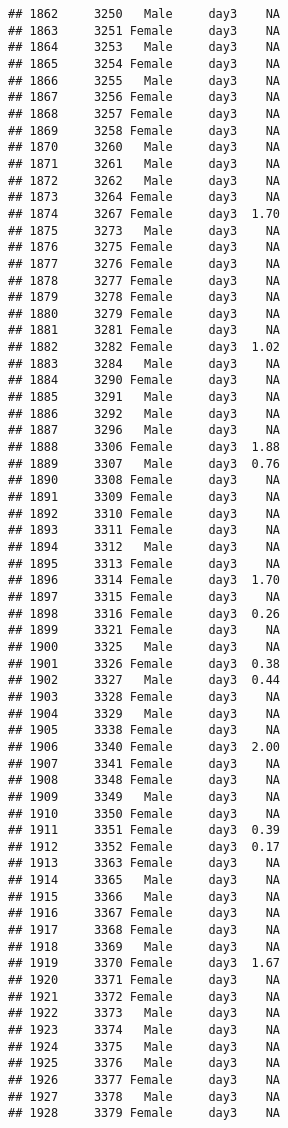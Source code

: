 \documentclass[
]{article}
\begin{document}
\begin{verbatim}
## 1862     3250   Male     day3    NA
## 1863     3251 Female     day3    NA
## 1864     3253   Male     day3    NA
## 1865     3254 Female     day3    NA
## 1866     3255   Male     day3    NA
## 1867     3256 Female     day3    NA
## 1868     3257 Female     day3    NA
## 1869     3258 Female     day3    NA
## 1870     3260   Male     day3    NA
## 1871     3261   Male     day3    NA
## 1872     3262   Male     day3    NA
## 1873     3264 Female     day3    NA
## 1874     3267 Female     day3  1.70
## 1875     3273   Male     day3    NA
## 1876     3275 Female     day3    NA
## 1877     3276 Female     day3    NA
## 1878     3277 Female     day3    NA
## 1879     3278 Female     day3    NA
## 1880     3279 Female     day3    NA
## 1881     3281 Female     day3    NA
## 1882     3282 Female     day3  1.02
## 1883     3284   Male     day3    NA
## 1884     3290 Female     day3    NA
## 1885     3291   Male     day3    NA
## 1886     3292   Male     day3    NA
## 1887     3296   Male     day3    NA
## 1888     3306 Female     day3  1.88
## 1889     3307   Male     day3  0.76
## 1890     3308 Female     day3    NA
## 1891     3309 Female     day3    NA
## 1892     3310 Female     day3    NA
## 1893     3311 Female     day3    NA
## 1894     3312   Male     day3    NA
## 1895     3313 Female     day3    NA
## 1896     3314 Female     day3  1.70
## 1897     3315 Female     day3    NA
## 1898     3316 Female     day3  0.26
## 1899     3321 Female     day3    NA
## 1900     3325   Male     day3    NA
## 1901     3326 Female     day3  0.38
## 1902     3327   Male     day3  0.44
## 1903     3328 Female     day3    NA
## 1904     3329   Male     day3    NA
## 1905     3338 Female     day3    NA
## 1906     3340 Female     day3  2.00
## 1907     3341 Female     day3    NA
## 1908     3348 Female     day3    NA
## 1909     3349   Male     day3    NA
## 1910     3350 Female     day3    NA
## 1911     3351 Female     day3  0.39
## 1912     3352 Female     day3  0.17
## 1913     3363 Female     day3    NA
## 1914     3365   Male     day3    NA
## 1915     3366   Male     day3    NA
## 1916     3367 Female     day3    NA
## 1917     3368 Female     day3    NA
## 1918     3369   Male     day3    NA
## 1919     3370 Female     day3  1.67
## 1920     3371 Female     day3    NA
## 1921     3372 Female     day3    NA
## 1922     3373   Male     day3    NA
## 1923     3374   Male     day3    NA
## 1924     3375   Male     day3    NA
## 1925     3376   Male     day3    NA
## 1926     3377 Female     day3    NA
## 1927     3378   Male     day3    NA
## 1928     3379 Female     day3    NA

\end{verbatim}
\end{document}
